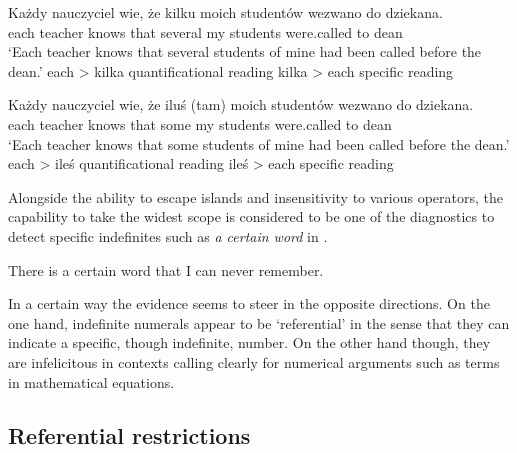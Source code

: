 \documentclass[output=paper,
]{langscibook}
\begin{document}
	\ea \gll Każdy nauczyciel wie, że kilku moich studentów wezwano do dziekana.\label{ex:indef-scope-kilka}\\
	each teacher knows that several my students were.called to dean\\
	\glt `Each teacher knows that several students of mine had been called before the dean.'
	\ea each > kilka \hfill quantificational reading\label{ex:indef-scope-kilka-quantificational}
	\ex kilka > each \hfill specific reading\label{ex:indef-scope-kilka-specific}
	\z
    \z

    \ea \gll Każdy nauczyciel wie, że {iluś (tam)} moich studentów wezwano do dziekana.\label{ex:indef-scope-iles}\\
	each teacher knows that some my students were.called to dean\\
	\glt `Each teacher knows that some students of mine had been called before the dean.'
	\ea each > ileś \hfill quantificational reading\label{ex:indef-scope-iles-quantificational}
	\ex ileś > each \hfill specific reading\label{ex:indef-scope-iles-specific}
	\z
    \z

	\noindent Alongside the ability to escape islands and insensitivity to various operators, the capability to take the widest scope is considered to be one of the diagnostics to detect specific indefinites such as \textit{a certain word} in .
	
	\ea There is a certain word that I can never remember.\label{ex:specific-indefinite}
    \z

\noindent In a certain way the evidence seems to steer in the opposite directions. On the one hand, indefinite numerals appear to be `referential' in the sense that they can indicate a specific, though indefinite, number. On the other hand though, they are infelicitous in contexts calling clearly for numerical arguments such as terms in mathematical equations.

	\subsection{Referential restrictions}\label{sec:referential-restrictions}
	
\end{document}
